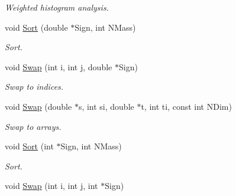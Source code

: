 \begin{DoxyCompactItemize}
\begin{DoxyCompactList}\small\item\em \-Weighted histogram analysis. \end{DoxyCompactList}\item 
\hypertarget{classMatematica_af650953b36f8898866541e0a18436487}{void \hyperlink{classMatematica_af650953b36f8898866541e0a18436487}{\-Sort} (double $\ast$\-Sign, int \-N\-Mass)}\label{classMatematica_af650953b36f8898866541e0a18436487}

\begin{DoxyCompactList}\small\item\em \-Sort. \end{DoxyCompactList}\item 
\hypertarget{classMatematica_a73416c2f40f207ac8a0ee0c620094c8f}{void \hyperlink{classMatematica_a73416c2f40f207ac8a0ee0c620094c8f}{\-Swap} (int i, int j, double $\ast$\-Sign)}\label{classMatematica_a73416c2f40f207ac8a0ee0c620094c8f}

\begin{DoxyCompactList}\small\item\em \-Swap to indices. \end{DoxyCompactList}\item 
\hypertarget{classMatematica_a48768f457142f01ca2980874f5546578}{void \hyperlink{classMatematica_a48768f457142f01ca2980874f5546578}{\-Swap} (double $\ast$s, int si, double $\ast$t, int ti, const int \-N\-Dim)}\label{classMatematica_a48768f457142f01ca2980874f5546578}

\begin{DoxyCompactList}\small\item\em \-Swap to arrays. \end{DoxyCompactList}\item 
\hypertarget{classMatematica_aab3ee9e44dd1ed078ca31182b4cd6ed2}{void \hyperlink{classMatematica_aab3ee9e44dd1ed078ca31182b4cd6ed2}{\-Sort} (int $\ast$\-Sign, int \-N\-Mass)}\label{classMatematica_aab3ee9e44dd1ed078ca31182b4cd6ed2}

\begin{DoxyCompactList}\small\item\em \-Sort. \end{DoxyCompactList}\item 
\hypertarget{classMatematica_ae664740009706537716b87e623af73de}{void \hyperlink{classMatematica_ae664740009706537716b87e623af73de}{\-Swap} (int i, int j, int $\ast$\-Sign)}\label{classMatematica_ae664740009706537716b87e623af73de}


\end{DoxyCompactItemize}
